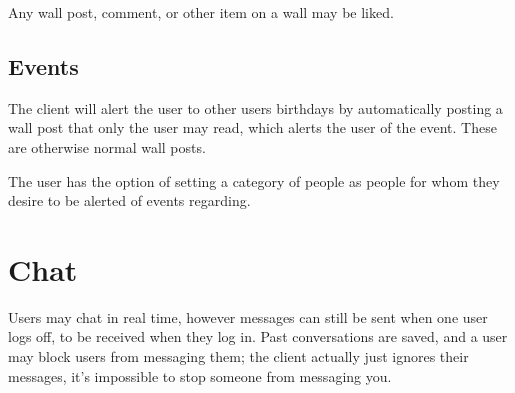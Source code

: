 Any wall post, comment, or other item on a wall may be liked.
    
\subsection{Events}
The client will alert the user to other users birthdays by automatically posting
a wall post that only the user may read, which alerts the user of the event.
These are otherwise normal wall posts.

The user has the option of setting a category of people as people for whom they
desire to be alerted of events regarding.

\section{Chat}
Users may chat in real time, however messages can still be sent when one user
logs off, to be received when they log in. Past conversations are saved, and a
user may block users from messaging them; the client actually just ignores their
messages, it's impossible to stop someone from messaging you.
